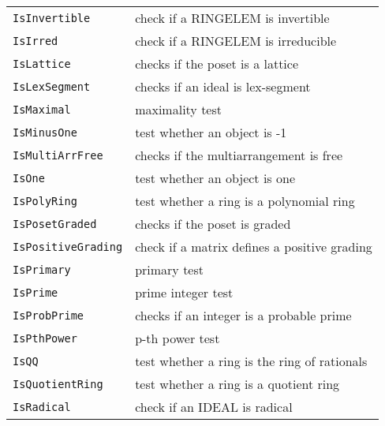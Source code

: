 \documentclass[a4paper]{mybook}
\begin{document}
\begin{center}
\begin{longtable}{ll}
{\verb~IsInvertible~} &
      check if a RINGELEM is invertible\\
   
{\verb~IsIrred~} &
      check if a RINGELEM is irreducible\\
   
{\verb~IsLattice~} &
      checks if the poset is a lattice\\
   
{\verb~IsLexSegment~} &
      checks if an ideal is lex-segment\\
   
{\verb~IsMaximal~} &
      maximality test\\
   
{\verb~IsMinusOne~} &
      test whether an object is -1\\
   
{\verb~IsMultiArrFree~} &
      checks if the multiarrangement is free\\
   
{\verb~IsOne~} &
      test whether an object is one\\
   
{\verb~IsPolyRing~} &
      test whether a ring is a polynomial ring\\
   
{\verb~IsPosetGraded~} &
      checks if the poset is graded\\
   
{\verb~IsPositiveGrading~} &
      check if a matrix defines a positive grading\\
   
{\verb~IsPrimary~} &
      primary test\\
   
{\verb~IsPrime~} &
      prime integer test\\
   
{\verb~IsProbPrime~} &
      checks if an integer is a probable prime\\
   
{\verb~IsPthPower~} &
      p-th power test\\
   
{\verb~IsQQ~} &
      test whether a ring is the ring of rationals\\
   
{\verb~IsQuotientRing~} &
      test whether a ring is a quotient ring\\
   
{\verb~IsRadical~} &
      check if an IDEAL is radical\\
   

\end{longtable}
\end{center}
\end{document}
